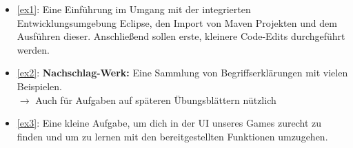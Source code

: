 \begin{itemize}
	\item \ref{ex1}: Eine Einführung im Umgang mit der integrierten Entwicklungsumgebung Eclipse, den Import von Maven Projekten und dem Ausführen dieser. Anschließend sollen erste, kleinere Code-Edits durchgeführt werden.
	\item \ref{ex2}: \textbf{Nachschlag-Werk:} Eine Sammlung von Begriffserklärungen mit vielen Beispielen.\\
	$\rightarrow$ Auch für Aufgaben auf späteren Übungsblättern nützlich
	\item \ref{ex3}: Eine kleine Aufgabe, um dich in der UI unseres Games zurecht zu finden und um zu lernen mit den bereitgestellten Funktionen umzugehen.
\end{itemize}
\newpage
